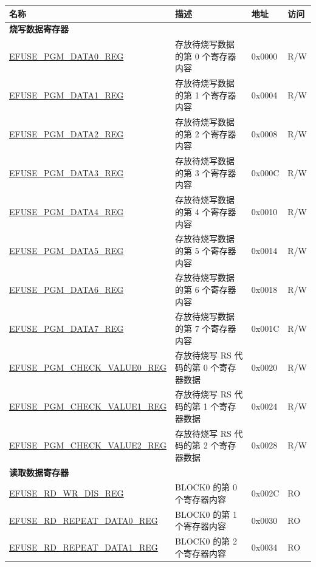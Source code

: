 \begin{longtable}{ | p{6.8cm} | p{7cm} | p{1.3cm} | p{1.2cm} | }
\hline\rowcolor{lightgray}
名称 & 描述 &  地址 & 访问 \\ \hline
\endhead
\multicolumn{4}{|l|}{\textbf{烧写数据寄存器}} \\ \hline
\hyperref[regdesc:EFUSEPGMDATA0REG]{EFUSE\_PGM\_DATA0\_REG} & 存放待烧写数据的第 0 个寄存器内容 & 0x0000 & R/W \\ \hline
\hyperref[regdesc:EFUSEPGMDATA1REG]{EFUSE\_PGM\_DATA1\_REG} & 存放待烧写数据的第 1 个寄存器内容 & 0x0004 & R/W \\ \hline
\hyperref[regdesc:EFUSEPGMDATA2REG]{EFUSE\_PGM\_DATA2\_REG} & 存放待烧写数据的第 2 个寄存器内容 & 0x0008 & R/W \\ \hline
\hyperref[regdesc:EFUSEPGMDATA3REG]{EFUSE\_PGM\_DATA3\_REG} & 存放待烧写数据的第 3 个寄存器内容 & 0x000C & R/W \\ \hline
\hyperref[regdesc:EFUSEPGMDATA4REG]{EFUSE\_PGM\_DATA4\_REG} & 存放待烧写数据的第 4 个寄存器内容 & 0x0010 & R/W \\ \hline
\hyperref[regdesc:EFUSEPGMDATA5REG]{EFUSE\_PGM\_DATA5\_REG} & 存放待烧写数据的第 5 个寄存器内容 & 0x0014 & R/W \\ \hline
\hyperref[regdesc:EFUSEPGMDATA6REG]{EFUSE\_PGM\_DATA6\_REG} & 存放待烧写数据的第 6 个寄存器内容 & 0x0018 & R/W \\ \hline
\hyperref[regdesc:EFUSEPGMDATA7REG]{EFUSE\_PGM\_DATA7\_REG} & 存放待烧写数据的第 7 个寄存器内容 & 0x001C & R/W \\ \hline
\hyperref[regdesc:EFUSEPGMCHECKVALUE0REG]{EFUSE\_PGM\_CHECK\_VALUE0\_REG} & 存放待烧写 RS 代码的第 0 个寄存器数据 & 0x0020 & R/W \\ \hline
\hyperref[regdesc:EFUSEPGMCHECKVALUE1REG]{EFUSE\_PGM\_CHECK\_VALUE1\_REG} & 存放待烧写 RS 代码的第 1 个寄存器数据 & 0x0024 & R/W \\ \hline
\hyperref[regdesc:EFUSEPGMCHECKVALUE2REG]{EFUSE\_PGM\_CHECK\_VALUE2\_REG} & 存放待烧写 RS 代码的第 2 个寄存器数据 & 0x0028 & R/W \\ \hline
\multicolumn{4}{|l|}{\textbf{读取数据寄存器}} \\ \hline
\hyperref[regdesc:EFUSERDWRDISREG]{EFUSE\_RD\_WR\_DIS\_REG} & BLOCK0 的第 0 个寄存器内容 & 0x002C & RO \\ \hline
\hyperref[regdesc:EFUSERDREPEATDATA0REG]{EFUSE\_RD\_REPEAT\_DATA0\_REG} & BLOCK0 的第 1 个寄存器内容 & 0x0030 & RO \\ \hline
\hyperref[regdesc:EFUSERDREPEATDATA1REG]{EFUSE\_RD\_REPEAT\_DATA1\_REG} & BLOCK0 的第 2 个寄存器内容 & 0x0034 & RO \\ \hline

\end{longtable}
